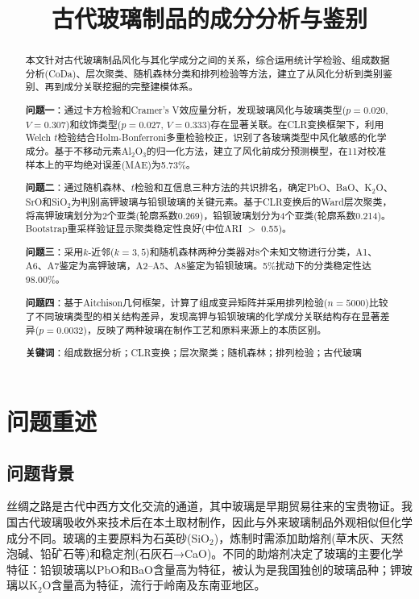 \documentclass[12pt,a4paper]{ctexart}
\title{\textbf{古代玻璃制品的成分分析与鉴别}}
\author{}
\date{}
\begin{document}
\maketitle

\begin{abstract}
\noindent 本文针对古代玻璃制品风化与其化学成分之间的关系，综合运用统计学检验、组成数据分析(CoDa)、层次聚类、随机森林分类和排列检验等方法，建立了从风化分析到类别鉴别、再到成分关联挖掘的完整建模体系。

\textbf{问题一}：通过卡方检验和Cramer's V效应量分析，发现玻璃风化与玻璃类型($p=0.020$, $V=0.307$)和纹饰类型($p=0.027$, $V=0.333$)存在显著关联。在CLR变换框架下，利用Welch $t$检验结合Holm-Bonferroni多重检验校正，识别了各玻璃类型中风化敏感的化学成分。基于不移动元素Al$_2$O$_3$的归一化方法，建立了风化前成分预测模型，在11对校准样本上的平均绝对误差(MAE)为5.73\%。

\textbf{问题二}：通过随机森林、$t$检验和互信息三种方法的共识排名，确定PbO、BaO、K$_2$O、SrO和SiO$_2$为判别高钾玻璃与铅钡玻璃的关键元素。基于CLR变换后的Ward层次聚类，将高钾玻璃划分为2个亚类(轮廓系数0.269)，铅钡玻璃划分为4个亚类(轮廓系数0.214)。Bootstrap重采样验证显示聚类稳定性良好(中位ARI $>$ 0.55)。

\textbf{问题三}：采用$k$-近邻($k=3,5$)和随机森林两种分类器对8个未知文物进行分类，A1、A6、A7鉴定为高钾玻璃，A2--A5、A8鉴定为铅钡玻璃。5\%扰动下的分类稳定性达98.00\%。

\textbf{问题四}：基于Aitchison几何框架，计算了组成变异矩阵并采用排列检验($n=5000$)比较了不同玻璃类型的相关结构差异，发现高钾与铅钡玻璃的化学成分关联结构存在显著差异($p=0.0032$)，反映了两种玻璃在制作工艺和原料来源上的本质区别。

\textbf{关键词}：组成数据分析；CLR变换；层次聚类；随机森林；排列检验；古代玻璃
\end{abstract}

\newpage
\tableofcontents
\newpage

\section{问题重述}
\subsection{问题背景}

丝绸之路是古代中西方文化交流的通道，其中玻璃是早期贸易往来的宝贵物证。我国古代玻璃吸收外来技术后在本土取材制作，因此与外来玻璃制品外观相似但化学成分不同。玻璃的主要原料为石英砂(SiO$_2$)，炼制时需添加助熔剂(草木灰、天然泡碱、铅矿石等)和稳定剂(石灰石→CaO)。不同的助熔剂决定了玻璃的主要化学特征：铅钡玻璃以PbO和BaO含量高为特征，被认为是我国独创的玻璃品种；钾玻璃以K$_2$O含量高为特征，流行于岭南及东南亚地区。
\end{document}
